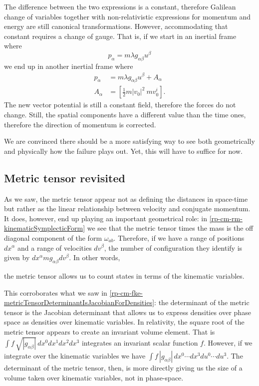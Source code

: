 The difference between the two expressions is a constant, therefore Galilean change of variables together with non-relativistic expressions for momentum and energy are still canonical transformations. However, accommodating that constant requires a change of gauge. That is, if we start in an inertial frame where
\begin{equation}
	p_{\alpha} = m \lambda g_{\alpha\beta} u^{\beta}
\end{equation}
we end up in another inertial frame where
\begin{equation}
	\begin{aligned}
	p_{\alpha} &= m \lambda g_{\alpha\beta} u^{\beta} + A_\alpha \\
	A_\alpha &= \left[\frac{1}{2} m|v_0|^2 \ mv_0^i\right].
	\end{aligned}
\end{equation}
The new vector potential is still a constant field, therefore the forces do not change. Still, the spatial components have a different value than the time ones, therefore the direction of momentum is corrected.

We are convinced there should be a more satisfying way to see both geometrically and physically how the failure plays out. Yet, this will have to suffice for now.

\subsection{Metric tensor revisited}

As we saw, the metric tensor appear not as defining the distances in space-time but rather as the linear relationship between velocity and conjugate momentum. It does, however, end up playing an important geometrical role: in \ref{rp-cm-rm-kinematicSymplecticForm} we see that the metric tensor times the mass is the off diagonal component of the form $\omega_{ab}$. Therefore, if we have a range of positions $dx^\alpha$ and a range of velocities $dv^\beta$, the number of configuration they identify is given by $dx^\alpha m g_{\alpha\beta} dv^\beta$. In other words,
\begin{insight}
	the metric tensor allows us to count states in terms of the kinematic variables.
\end{insight}

This corroborates what we saw in \ref{rp-cm-fke-metricTensorDeterminantIsJacobianForDensities}: the determinant of the metric tensor is the Jacobian determinant that allows us to express densities over phase space as densities over kinematic variables. In relativity, the square root of the metric tensor appears to create an invariant volume element. That is $\int f \, \sqrt{|g_{\alpha\beta}|} \, dx^0 dx^1 dx^2 dx^3$ integrates an invariant scalar function $f$. However, if we integrate over the kinematic variables we have $\int f \, |g_{\alpha\beta}| \, dx^0 \cdots dx^3 du^0 \cdots du^3$. The determinant of the metric tensor, then, is more directly giving us the size of a volume taken over kinematic variables, not in phase-space.

